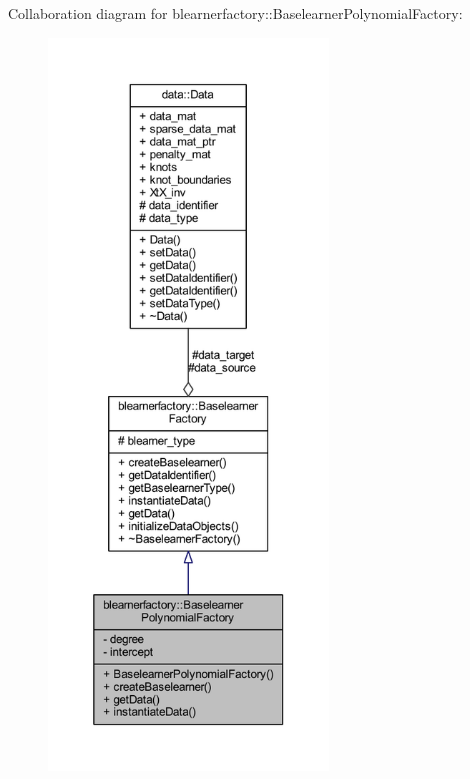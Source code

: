Collaboration diagram for blearnerfactory\+:\+:Baselearner\+Polynomial\+Factory\+:
\nopagebreak
\begin{figure}[H]
\begin{center}
\leavevmode
\includegraphics[height=550pt]{classblearnerfactory_1_1_baselearner_polynomial_factory__coll__graph}
\end{center}
\end{figure}
